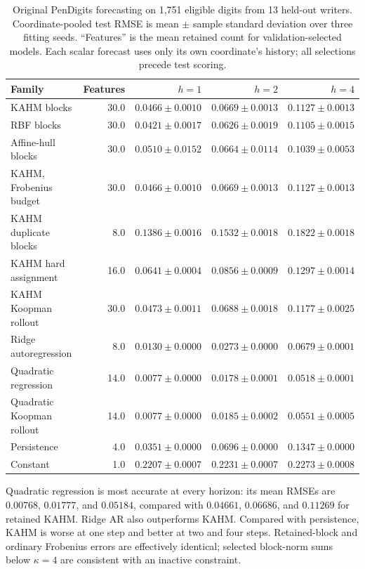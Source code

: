 \begin{table}[t]
  \centering
  \small
  \setlength{\tabcolsep}{3pt}
\begin{tabular}{lrrrr}
\toprule
Family & Features & $h=1$ & $h=2$ & $h=4$ \\
\midrule
KAHM blocks & 30.0 & $0.0466\pm0.0010$ & $0.0669\pm0.0013$ & $0.1127\pm0.0013$ \\
RBF blocks & 30.0 & $0.0421\pm0.0017$ & $0.0626\pm0.0019$ & $0.1105\pm0.0015$ \\
Affine-hull blocks & 30.0 & $0.0510\pm0.0152$ & $0.0664\pm0.0114$ & $0.1039\pm0.0053$ \\
KAHM, Frobenius budget & 30.0 & $0.0466\pm0.0010$ & $0.0669\pm0.0013$ & $0.1127\pm0.0013$ \\
KAHM duplicate blocks & 8.0 & $0.1386\pm0.0016$ & $0.1532\pm0.0018$ & $0.1822\pm0.0018$ \\
KAHM hard assignment & 16.0 & $0.0641\pm0.0004$ & $0.0856\pm0.0009$ & $0.1297\pm0.0014$ \\
KAHM Koopman rollout & 30.0 & $0.0473\pm0.0011$ & $0.0688\pm0.0018$ & $0.1177\pm0.0025$ \\
Ridge autoregression & 8.0 & $0.0130\pm0.0000$ & $0.0273\pm0.0000$ & $0.0679\pm0.0001$ \\
Quadratic regression & 14.0 & $0.0077\pm0.0000$ & $0.0178\pm0.0001$ & $0.0518\pm0.0001$ \\
Quadratic Koopman rollout & 14.0 & $0.0077\pm0.0000$ & $0.0185\pm0.0002$ & $0.0551\pm0.0005$ \\
Persistence & 4.0 & $0.0351\pm0.0000$ & $0.0696\pm0.0000$ & $0.1347\pm0.0000$ \\
Constant & 1.0 & $0.2207\pm0.0007$ & $0.2231\pm0.0007$ & $0.2273\pm0.0008$ \\
\bottomrule
\end{tabular}

  \caption{Original PenDigits forecasting on 1,751 eligible digits from
  13 held-out writers. Coordinate-pooled test RMSE is mean $\pm$ sample
  standard deviation over three fitting seeds. ``Features'' is the mean
  retained count for validation-selected models. Each scalar forecast uses
  only its own coordinate's history; all selections precede test scoring.}
  \label{tab:pendigits}
\end{table}

Quadratic regression is most accurate at every horizon: its mean RMSEs are
$0.00768$, $0.01777$, and $0.05184$, compared with $0.04661$, $0.06686$,
and $0.11269$ for retained KAHM.
Ridge AR also outperforms KAHM. Compared with persistence, KAHM is worse at
one step and better at two and four steps. Retained-block and ordinary
Frobenius errors are effectively identical; selected block-norm sums below
$\kappa=4$ are consistent with an inactive constraint.

